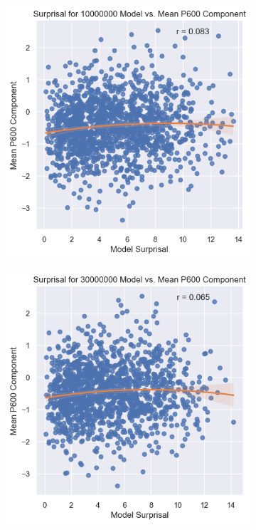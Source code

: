 \documentclass{IEEEtran}
\begin{document}
\begin{figure}[h]
    \centering
    \begin{subfigure}{0.4\textwidth}
        \centering
        \includegraphics[width=\textwidth]{surprisal_vs_p600/10000000.png}
    \end{subfigure}
    \begin{subfigure}{0.4\textwidth}
        \centering
        \includegraphics[width=\textwidth]{surprisal_vs_p600/30000000.png}
    \end{subfigure}
\end{figure}
\end{document}
